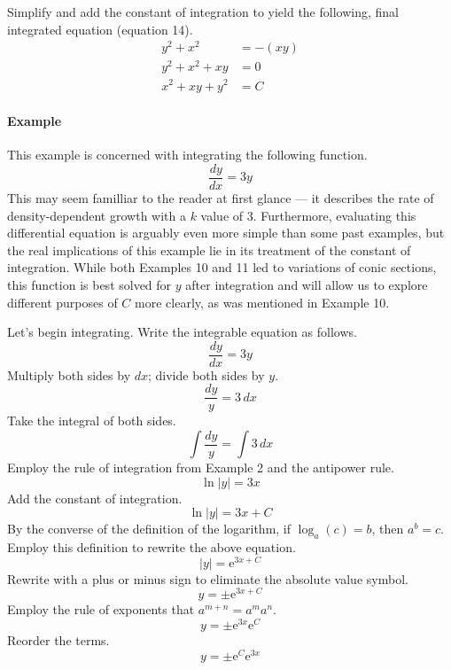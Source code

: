 \documentclass{article}
\newcounter{example}%
\newcommand{\ex}{\stepcounter{example} \paragraph{Example \theexample}}
\begin{document}
Simplify and add the constant of integration to yield the following, final integrated equation (equation 14).
\begin{align*}
    y^2+x^2 &= -\left(xy\right)\\
    y^2+x^2+xy &= 0\\
    x^2+xy+y^2 &= C\tag{14}
\end{align*}
\vspace{-2em}
\ex This example is concerned with integrating the following function.$$\frac{dy}{dx}=3y$$
This may seem familliar to the reader at first glance --- it describes the rate of density-dependent growth with a $k$ value of 3. Furthermore, evaluating this differential equation is arguably even more simple than some past examples, but the real implications of this example lie in its treatment of the constant of integration. While both Examples 10 and 11 led to variations of conic sections, this function is best solved for $y$ after integration and will allow us to explore different purposes of $C$ more clearly, as was mentioned in Example 10.\par
Let's begin integrating. Write the integrable equation as follows.
\begin{equation*}
    \frac{dy}{dx}=3y
\end{equation*}
Multiply both sides by $dx$; divide both sides by $y$.
\begin{equation*}
    \frac{dy}{y}=3\, dx
\end{equation*}
Take the integral of both sides.
\begin{equation*}
    \int \frac{dy}{y}=\int 3\, dx
\end{equation*}
Employ the rule of integration from Example 2 and the antipower rule.
\begin{equation*}
    \ln|y|=3x
\end{equation*}
Add the constant of integration.
\begin{equation*}
    \ln|y|=3x+C
\end{equation*}
By the converse of the definition of the logarithm, if $\log_a(c)=b$, then $a^b=c$. Employ this definition to rewrite the above equation.
\begin{equation*}
    |y|=\text{e}^{3x+C}
\end{equation*}
Rewrite with a plus or minus sign to eliminate the absolute value symbol.
\begin{equation*}
    y=\pm\text{e}^{3x+C}
\end{equation*}
Employ the rule of exponents that $a^{m+n}=a^ma^n$.
\begin{equation*}
    y=\pm\text{e}^{3x}\text{e}^C
\end{equation*}
Reorder the terms.
\begin{equation*}
    y=\pm\text{e}^C\text{e}^{3x}
\end{equation*}
\end{document}
